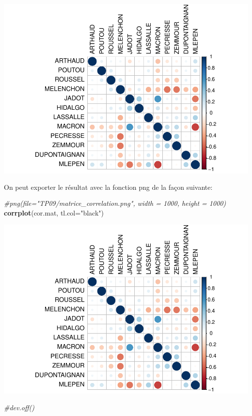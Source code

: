\documentclass[
]{book}
\newenvironment{Shaded}{\begin{snugshade}}{\end{snugshade}}
\newcommand{\AttributeTok}[1]{\textcolor[rgb]{0.13,0.29,0.53}{#1}}
\newcommand{\CommentTok}[1]{\textcolor[rgb]{0.56,0.35,0.01}{\textit{#1}}}
\newcommand{\FunctionTok}[1]{\textcolor[rgb]{0.13,0.29,0.53}{\textbf{#1}}}
\newcommand{\NormalTok}[1]{#1}
\newcommand{\StringTok}[1]{\textcolor[rgb]{0.31,0.60,0.02}{#1}}
\begin{document}
\includegraphics{bookdown-demo_files/figure-latex/unnamed-chunk-54-1.pdf}

On peut exporter le résultat avec la fonction png de la façon suivante:

\begin{Shaded}
\begin{Highlighting}[]
\CommentTok{\#png(file="TP09/matrice\_correlation.png", width = 1000, height = 1000)}
\FunctionTok{corrplot}\NormalTok{(cor.mat, }\AttributeTok{tl.col=}\StringTok{"black"}\NormalTok{)}
\end{Highlighting}
\end{Shaded}

\includegraphics{bookdown-demo_files/figure-latex/unnamed-chunk-55-1.pdf}

\begin{Shaded}
\begin{Highlighting}[]
\CommentTok{\#dev.off()}
\end{Highlighting}
\end{Shaded}
\end{document}
